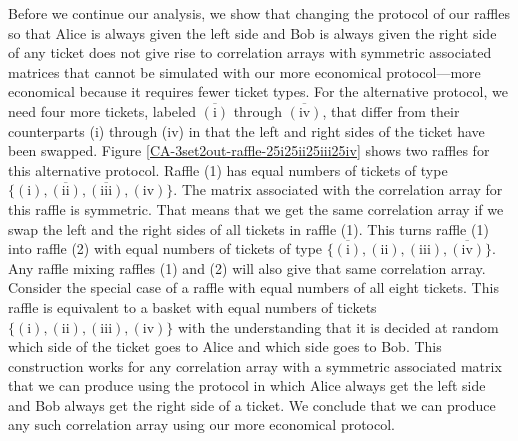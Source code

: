 Before we continue our analysis, we show that changing the protocol of our raffles so that Alice is always given the left side and Bob is always given the right side of any ticket does not give rise to correlation arrays with symmetric associated matrices that cannot be simulated with our more economical protocol---more economical because it requires fewer ticket types. For the alternative protocol, we need four more tickets, labeled $\overline{(\mathrm{i})}$ through $\overline{(\mathrm{iv})}$, that differ from their counterparts (i) through (iv) in that the left and right sides of the ticket have been swapped. Figure \ref{CA-3set2out-raffle-25i25ii25iii25iv} shows two raffles for this alternative protocol. Raffle (1) has equal numbers of tickets of type $\big\{ \mathrm{(i)}, \overline{(\mathrm{ii})}, \overline{(\mathrm{iii})}, \mathrm{(iv)} \big\}$. The matrix associated with the correlation array for this raffle is symmetric. That means that we get the same correlation array if we swap the left and the right sides of all tickets in raffle (1). This turns raffle (1) into raffle (2) with equal numbers of tickets of type $\big\{ \overline{(\mathrm{i})}, \mathrm{(ii)}, \mathrm{(iii)}, \overline{(\mathrm{iv})} \big\}$.  Any raffle mixing raffles (1) and (2) will also give that same correlation array. Consider the special case of a raffle with equal numbers of all eight tickets. This raffle is equivalent to a basket with equal numbers of tickets $\big\{  \mathrm{(i)},  \mathrm{(ii)},  \mathrm{(iii)},  \mathrm{(iv)} \big\}$ with the understanding that it is decided at random which side of the ticket goes to Alice and which side goes to Bob. This construction works for any correlation array with a symmetric associated matrix that we can produce using the protocol in which Alice always get the left side and Bob always get the right side of a ticket. We conclude that we can produce any such correlation array using our more economical protocol. 

